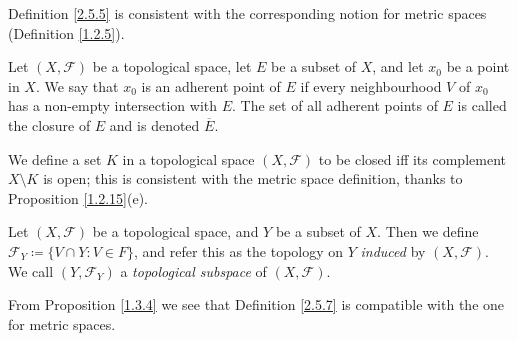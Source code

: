 \begin{note}
    Definition \ref{2.5.5} is consistent with the corresponding notion for metric spaces (Definition \ref{1.2.5}).
\end{note}

\begin{definition}[Closure]\label{2.5.6}
    Let \((X, \mathcal{F})\) be a topological space, let \(E\) be a subset of \(X\), and let \(x_0\) be a point in \(X\).
    We say that \(x_0\) is an adherent point of \(E\) if every neighbourhood \(V\) of \(x_0\) has a non-empty intersection with \(E\).
    The set of all adherent points of \(E\) is called the closure of \(E\) and is denoted \(\overline{E}\).
\end{definition}

\begin{note}
    We define a set \(K\) in a topological space \((X, \mathcal{F})\) to be closed iff its complement \(X \setminus K\) is open;
    this is consistent with the metric space definition, thanks to Proposition \ref{1.2.15}(e).
\end{note}

\begin{definition}\label{2.5.7}
    Let \((X, \mathcal{F})\) be a topological space, and \(Y\) be a subset of \(X\).
    Then we define \(\mathcal{F}_Y \coloneqq \{V \cap Y : V \in F\}\), and refer this as the topology on \(Y\) \emph{induced} by \((X, \mathcal{F})\).
    We call \((Y, \mathcal{F}_Y)\) a \emph{topological subspace} of \((X, \mathcal{F})\).
\end{definition}

\begin{note}
    From Proposition \ref{1.3.4} we see that Definition \ref{2.5.7} is compatible with the one for metric spaces.
\end{note}